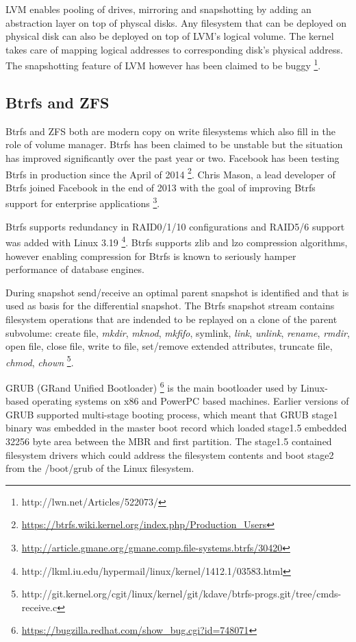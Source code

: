 \documentclass{article}
\begin{document}
LVM enables pooling of drives, mirroring and snapshotting by adding
an abstraction layer on top of physcal disks. Any filesystem that
can be deployed on physical disk can also be deployed on top of
LVM's logical volume. The kernel takes care of mapping logical
addresses to corresponding disk's physical address.
The snapshotting feature of LVM however has been claimed to be buggy
\footnote{http://lwn.net/Articles/522073/}.

\subsection{Btrfs and ZFS}

Btrfs and ZFS both are modern copy on write filesystems
which also fill in the role of volume manager.
Btrfs has been claimed to be unstable but the situation has
improved significantly over the past year or two.
Facebook has been testing Btrfs in production since the April of 2014
\footnote{\url{https://btrfs.wiki.kernel.org/index.php/Production_Users}}.
Chris Mason, a lead developer of Btrfs joined Facebook
in the end of 2013 with the goal of improving Btrfs support
for enterprise applications
\footnote{\url{http://article.gmane.org/gmane.comp.file-systems.btrfs/30420}}.

Btrfs supports redundancy in RAID0/1/10 configurations and
RAID5/6 support was added with Linux 3.19
\footnote{http://lkml.iu.edu/hypermail/linux/kernel/1412.1/03583.html}.
Btrfs supports zlib and lzo compression algorithms,
however enabling compression for Btrfs is known to
seriously hamper performance of database engines.

During snapshot send/receive an optimal parent snapshot is
identified and that is used as basis for the differential snapshot.
The Btrfs snapshot stream contains filesystem operations that are indended to be replayed on a clone of the parent subvolume:
create file, \emph{mkdir}, \emph{mknod}, \emph{mkfifo}, symlink,
\emph{link}, \emph{unlink}, \emph{rename}, \emph{rmdir}, open file,
close file, write to file, set/remove extended attributes,
truncate file, \emph{chmod}, \emph{chown}
\footnote{http://git.kernel.org/cgit/linux/kernel/git/kdave/btrfs-progs.git/tree/cmds-receive.c}.

GRUB (GRand Unified Bootloader)
\footnote{\url{https://bugzilla.redhat.com/show_bug.cgi?id=748071}}
is the main bootloader used
by Linux-based operating systems on x86 and PowerPC based machines.
Earlier versions of GRUB supported multi-stage booting process,
which meant that GRUB stage1 binary was embedded in the
master boot record which loaded stage1.5 embedded
32256 byte area between the MBR and first partition.
The stage1.5 contained filesystem drivers which could
address the filesystem contents and boot stage2 from
the /boot/grub of the Linux filesystem.
\end{document}
